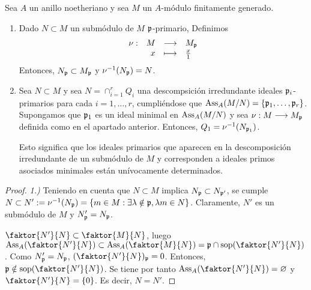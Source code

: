 \documentclass[../main.tex]{subfiles}
\begin{document}
\begin{theorem}
Sea $A$ un anillo noetheriano y sea $M$ un $A$-módulo finitamente generado.\begin{enumerate}
    \item Dado $N\subset M$ un submódulo de $M$ $\mathfrak{p}$-primario, Definimos
    $$\begin{array}{rrcl}
	\nu:&M&\longrightarrow&M_{\mathfrak{p}}\\
	&x&\longmapsto&\frac{x}{1}\\ \end{array}$$ Entonces, $N_{\mathfrak{p}}\subset M_{\mathfrak{p}}$ y $\nu^{-1}(N_{\mathfrak{p}})=N$.
	\item Sea $N\subset M$ y sea $N=\cap_{i=1}^rQ_i$ una descompsición irredundante ideales $\mathfrak{p}_i$-primarios para cada $i=1,\dots,r$, cumpliéndose que $\text{Ass}_A(M/N)=\{\mathfrak{p}_1,\dots,\mathfrak{p}_r\}$. Supongamos que $\mathfrak{p}_1$ es un ideal minimal en $\text{Ass}_A(M/N)$ y sea $\nu:M\longrightarrow M_{\mathfrak{p}}$ definida como en el apartado anterior. Entonces, $Q_1=\nu^{-1}(N_{\mathfrak{p}_1})$.

	Esto significa que los ideales primarios que aparecen en la descomposición irredundante de un submódulo de $M$ y corresponden a ideales primos asociados minimales están unívocamente determinados.
\end{enumerate}
\end{theorem}
\begin{proof}
\textit{1.)} Teniendo en cuenta que $N\subset M$ implica $N_{\mathfrak{p}}\subset N_{\mathfrak{p}'}$, se cumple $N\subset N':=\nu^{-1}(N_{\mathfrak{p}})=\{m\in M:\exists\lambda\notin\mathfrak{p}, \lambda m\in N\}$. Claramente, $N'$ es un submódulo de $M$ y $N_{\mathfrak{p}}'=N_{\mathfrak{p}}$.

$\faktor{N'}{N}\subset\faktor{M}{N}$, luego $\Ass_A(\faktor{N'}{N})\subset\Ass_A(\faktor{M}{N})=\p\cap\operatorname{sop}(\faktor{N'}{N})$. Como $N_{\mathfrak{p}}'=N_{\mathfrak{p}}$, $(\faktor{N'}{N})_{\p}=0$. Entonces, $\p\notin\operatorname{sop}(\faktor{N'}{N})$. Se tiene por tanto $\Ass_A(\faktor{N'}{N})=\varnothing$ y $\faktor{N'}{N}=\{0\}$. Es decir, $N=N'$.
\end{proof}
\end{document}
